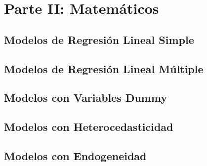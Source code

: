 \documentclass[
]{book}
\begin{document}
\section{Parte II: Matemáticos}\label{parte-ii-matemuxe1ticos}

\subsection{Modelos de Regresión Lineal Simple}\label{modelos-de-regresiuxf3n-lineal-simple}

\subsection{Modelos de Regresión Lineal Múltiple}\label{modelos-de-regresiuxf3n-lineal-muxfaltiple}

\subsection{Modelos con Variables Dummy}\label{modelos-con-variables-dummy}

\subsection{Modelos con Heterocedasticidad}\label{modelos-con-heterocedasticidad}

\subsection{Modelos con Endogeneidad}\label{modelos-con-endogeneidad}
\end{document}

